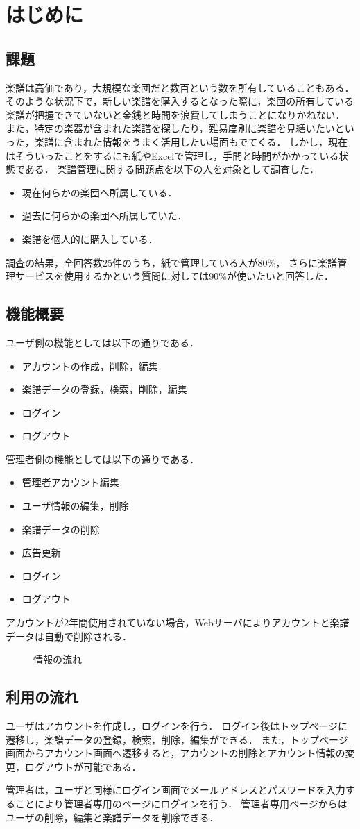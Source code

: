 \chapter{{はじめに}}
\section{課題}
楽譜は高価であり，大規模な楽団だと数百という数を所有していることもある．
そのような状況下で，新しい楽譜を購入するとなった際に，楽団の所有している楽譜が把握できていないと金銭と時間を浪費してしまうことになりかねない．
また，特定の楽器が含まれた楽譜を探したり，難易度別に楽譜を見繕いたいといった，楽譜に含まれた情報をうまく活用したい場面もでてくる．
しかし，現在はそういったことをするにも紙やExcelで管理し，手間と時間がかかっている状態である．
楽譜管理に関する問題点を以下の人を対象として調査した．
\begin{itemize}
    \item 現在何らかの楽団へ所属している．
    \item 過去に何らかの楽団へ所属していた．
    \item 楽譜を個人的に購入している．
\end{itemize}
調査の結果，全回答数25件のうち，紙で管理している人が80\%，
さらに楽譜管理サービスを使用するかという質問に対しては90\%が使いたいと回答した．
\section{機能概要}
ユーザ側の機能としては以下の通りである．
\begin{itemize}
    \item アカウントの作成，削除，編集
    \item 楽譜データの登録，検索，削除，編集
    \item ログイン
    \item ログアウト
\end{itemize}
管理者側の機能としては以下の通りである．
\begin{itemize}
    \item 管理者アカウント編集
    \item ユーザ情報の編集，削除
    \item 楽譜データの削除
    \item 広告更新
    \item ログイン
    \item ログアウト
\end{itemize}
アカウントが2年間使用されていない場合，Webサーバによりアカウントと楽譜データは自動で削除される．
\begin{figure}[h]
    \centering
    
    \caption{情報の流れ}
\end{figure}
\section{利用の流れ}
ユーザはアカウントを作成し，ログインを行う．
ログイン後はトップページに遷移し，楽譜データの登録，検索，削除，編集ができる．
また，トップページ画面からアカウント画面へ遷移すると，アカウントの削除とアカウント情報の変更，ログアウトが可能である．\par
管理者は，ユーザと同様にログイン画面でメールアドレスとパスワードを入力することにより管理者専用のページにログインを行う．
管理者専用ページからはユーザの削除，編集と楽譜データを削除できる．